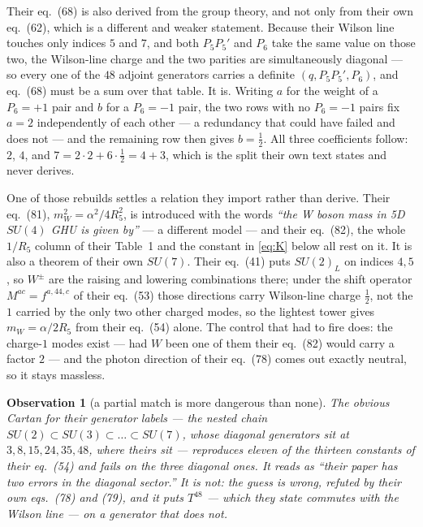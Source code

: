 \documentclass[11pt,a4paper]{article}
\newtheorem{observation}{Observation}
\newcommand{\su}[1]{SU(#1)}
\begin{document}
Their eq.~(68) is also derived from the group theory, and not only from their own eq.~(62), which is
a different and weaker statement. Because their Wilson line touches only indices $5$ and $7$, and
both $P_5P_5'$ and $P_6$ take the same value on those two, the Wilson-line charge and the two
parities are simultaneously diagonal --- so every one of the $48$ adjoint generators carries a
definite $(q,P_5P_5',P_6)$, and eq.~(68) must be a sum over that table. It is. Writing $a$ for the
weight of a $P_6=+1$ pair and $b$ for a $P_6=-1$ pair, the two rows with no $P_6=-1$ pairs fix
$a=2$ independently of each other --- a redundancy that could have failed and does not --- and the
remaining row then gives $b=\tfrac12$. All three coefficients follow: $2$, $4$, and
$7=2\cdot2+6\cdot\tfrac12=4+3$, which is the split their own text states and never derives.

One of those rebuilds settles a relation they import rather than derive. Their eq.~(81),
$m_W^2=\alpha^2/4R_5^2$, is introduced with the words \emph{``the W boson mass in 5D $\su4$ GHU is
given by''} --- a different model --- and their eq.~(82), the whole $1/R_5$ column of their Table~1
and the constant in \eqref{eq:K} below all rest on it. It is also a theorem of their own $\su7$.
Their eq.~(41) puts $\su2_L$ on indices $4,5$, so $W^\pm$ are the raising and lowering combinations
there; under the shift operator $M^{ac}=f^{a,44,c}$ of their eq.~(53) those directions carry
Wilson-line charge $\tfrac12$, not the $1$ carried by the only two other charged modes, so the
lightest tower gives $m_W=\alpha/2R_5$ from their eq.~(54) alone. The control that had to fire does:
the charge-$1$ modes exist --- had $W$ been one of them their eq.~(82) would carry a factor $2$ ---
and the photon direction of their eq.~(78) comes out exactly neutral, so it stays massless.

\begin{observation}[a partial match is more dangerous than none]
The obvious Cartan for their generator labels --- the nested chain
$\su2\subset\su3\subset\dots\subset\su7$, whose diagonal generators sit at $3,8,15,24,35,48$, where
theirs sit --- reproduces \emph{eleven of the thirteen} constants of their eq.~(54) and fails on the
three diagonal ones. It reads as ``their paper has two errors in the diagonal sector.'' It is not:
the guess is wrong, refuted by their own eqs.~(78) and (79), and it puts $T^{48}$ --- which they
state commutes with the Wilson line --- on a generator that does not.
\end{observation}
\end{document}
